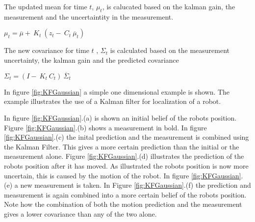 The updated mean for time $t$, $\mu_t$, is calucated based on the kalman gain, the measurement and the uncertaintity in the measurement.

\begin{center}
	$\mu_t =  \overline{\mu} + \ K_t \ (z_t- \ C_t \ \overline{\mu}_t)$ \\
\end{center}

The new covariance for time $t$ , $\Sigma_t$ is calculated based on the measurement uncertainty, the kalman gain and the predicted covariance
\begin{center}
$\Sigma_t = (I - \ K_t \ C_t) \ \overline{\Sigma}_t$ \\
\end{center}


In figure \ref{fig:KFGaussian} a simple one dimensional example is shown. The example illustrates the use of a Kalman filter for localization of a robot. 

In figure \ref{fig:KFGaussian}.(a) is shown an initial belief of the robots position. Figure \ref{fig:KFGaussian}.(b) shows a measurement in bold. In figure \ref{fig:KFGaussian}.(c) the inital prediction and the measurement is combined using the Kalman Filter. This gives a more certain prediction than the initial or the measurement alone. Figure \ref{fig:KFGaussian}.(d) illustrates the prediction of the robots position after it has moved. As illustrated the robots position is now more uncertain, this is caused by the motion of the robot. In figure \ref{fig:KFGaussian}.(e) a new measurement is taken. In Figure \ref{fig:KFGaussian}.(f) the prediction and measurement is again combined into a more certain belief of the robots position. Note how the combination of both the motion prediction and the measurement gives a lower covariance than any of the two alone. 

